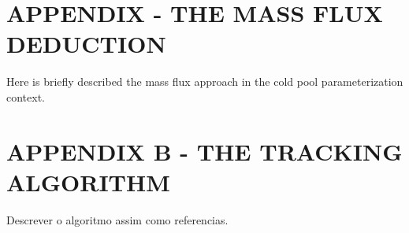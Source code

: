\hypertarget{estilo:apendice}{} %
\renewcommand{\thechapter}{A} %
\chapter{APPENDIX - THE MASS FLUX DEDUCTION}
\label{appendixA}


Here is briefly described the mass flux approach in the cold pool parameterization context.


\chapter{APPENDIX B - THE TRACKING ALGORITHM}
\label{appendixB}
Descrever o algoritmo assim como referencias.